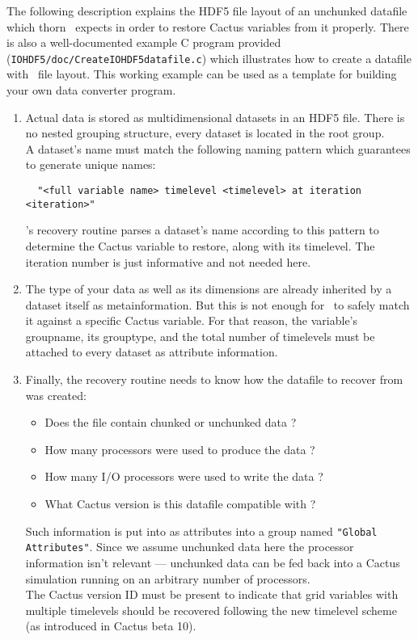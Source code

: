 \documentclass{article}
\begin{document}
The following description explains the HDF5 file layout of an unchunked
datafile which thorn \ThisThorn\ expects in order to restore Cactus variables
from it properly. There is also a well-documented example C program provided
({\tt IOHDF5/doc/CreateIOHDF5datafile.c}) which illustrates how to create
a datafile with \ThisThorn\ file layout. This working example can be used as a
template for building your own data converter program.\\

\begin{enumerate}
  \item Actual data is stored as multidimensional datasets in an HDF5 file.
        There is no nested grouping structure, every dataset is located
        in the root group.\\
        A dataset's name must match the following naming pattern which
        guarantees to generate unique names:
\begin{verbatim}
  "<full variable name> timelevel <timelevel> at iteration <iteration>"
\end{verbatim}
        \ThisThorn's recovery routine parses a dataset's name according to this
        pattern to determine the Cactus variable to restore, along with its
        timelevel. The iteration number is just informative and not needed here.

  \item The type of your data as well as its dimensions are already
        inherited by a dataset itself as metainformation. But this is not
        enough for \ThisThorn\ to safely match it against a specific Cactus variable.
        For that reason, the variable's groupname, its grouptype, and the
        total number of timelevels must be attached to every dataset
        as attribute information.

  \item Finally, the recovery routine needs to know how the datafile to
        recover from was created:
        \begin{itemize}
          \item Does the file contain chunked or unchunked data ?
          \item How many processors were used to produce the data ?
          \item How many I/O processors were used to write the data ?
          \item What Cactus version is this datafile compatible with ?
        \end{itemize}
        Such information is put into as attributes into a group named
        {\tt "Global Attributes"}. Since we assume unchunked data here
        the processor information isn't relevant --- unchunked data can
        be fed back into a Cactus simulation running on an arbitrary
        number of processors.\\
        The Cactus version ID must be present to indicate that grid variables
        with multiple timelevels should be recovered following the new
        timelevel scheme (as introduced in Cactus beta 10).
\end{enumerate}
\end{document}

